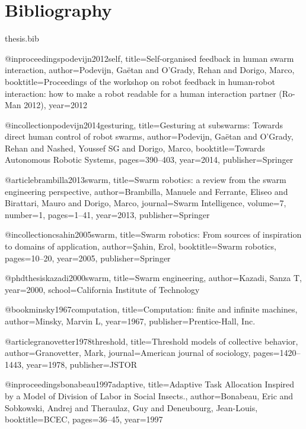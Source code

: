\documentclass[oneside, a4paper, 12pt]{memoir}
\begin{document}
\part*{Bibliography}

\begin{filecontents}{thesis.bib}

@inproceedings{podevijn2012self,
  title={Self-organised feedback in human swarm interaction},
  author={Podevijn, Ga{\"e}tan and O’Grady, Rehan and Dorigo, Marco},
  booktitle={Proceedings of the workshop on robot feedback in human-robot interaction: how to make a robot readable for a human interaction partner (Ro-Man 2012)},
  year={2012}
}

@incollection{podevijn2014gesturing,
  title={Gesturing at subswarms: Towards direct human control of robot swarms},
  author={Podevijn, Ga{\"e}tan and O’Grady, Rehan and Nashed, Youssef SG and Dorigo, Marco},
  booktitle={Towards Autonomous Robotic Systems},
  pages={390--403},
  year={2014},
  publisher={Springer}
}

@article{brambilla2013swarm,
  title={Swarm robotics: a review from the swarm engineering perspective},
  author={Brambilla, Manuele and Ferrante, Eliseo and Birattari, Mauro and Dorigo, Marco},
  journal={Swarm Intelligence},
  volume={7},
  number={1},
  pages={1--41},
  year={2013},
  publisher={Springer}
}

@incollection{csahin2005swarm,
  title={Swarm robotics: From sources of inspiration to domains of application},
  author={{\c{S}}ahin, Erol},
  booktitle={Swarm robotics},
  pages={10--20},
  year={2005},
  publisher={Springer}
}

@phdthesis{kazadi2000swarm,
  title={Swarm engineering},
  author={Kazadi, Sanza T},
  year={2000},
  school={California Institute of Technology}
}

@book{minsky1967computation,
  title={Computation: finite and infinite machines},
  author={Minsky, Marvin L},
  year={1967},
  publisher={Prentice-Hall, Inc.}
}

@article{granovetter1978threshold,
  title={Threshold models of collective behavior},
  author={Granovetter, Mark},
  journal={American journal of sociology},
  pages={1420--1443},
  year={1978},
  publisher={JSTOR}
}

@inproceedings{bonabeau1997adaptive,
  title={Adaptive Task Allocation Inspired by a Model of Division of Labor in Social Insects.},
  author={Bonabeau, Eric and Sobkowski, Andrej and Theraulaz, Guy and Deneubourg, Jean-Louis},
  booktitle={BCEC},
  pages={36--45},
  year={1997}
}


\end{filecontents}
\end{document}
